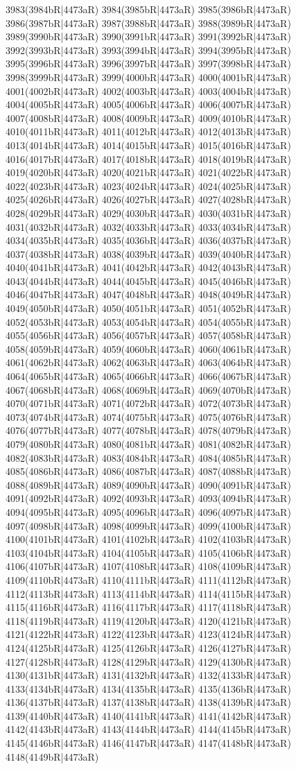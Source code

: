 3983(3984bR|4473aR) 3984(3985bR|4473aR) 3985(3986bR|4473aR) 3986(3987bR|4473aR) 3987(3988bR|4473aR) 3988(3989bR|4473aR) 3989(3990bR|4473aR) 3990(3991bR|4473aR) 3991(3992bR|4473aR) 3992(3993bR|4473aR) 3993(3994bR|4473aR) 3994(3995bR|4473aR) 3995(3996bR|4473aR) 3996(3997bR|4473aR) 3997(3998bR|4473aR) 3998(3999bR|4473aR) 3999(4000bR|4473aR) 4000(4001bR|4473aR) 4001(4002bR|4473aR) 4002(4003bR|4473aR) 4003(4004bR|4473aR) 4004(4005bR|4473aR) 4005(4006bR|4473aR) 4006(4007bR|4473aR) 4007(4008bR|4473aR) 4008(4009bR|4473aR) 4009(4010bR|4473aR) 4010(4011bR|4473aR) 4011(4012bR|4473aR) 4012(4013bR|4473aR) 4013(4014bR|4473aR) 4014(4015bR|4473aR) 4015(4016bR|4473aR) 4016(4017bR|4473aR) 4017(4018bR|4473aR) 4018(4019bR|4473aR) 4019(4020bR|4473aR) 4020(4021bR|4473aR) 4021(4022bR|4473aR) 4022(4023bR|4473aR) 4023(4024bR|4473aR) 4024(4025bR|4473aR) 4025(4026bR|4473aR) 4026(4027bR|4473aR) 4027(4028bR|4473aR) 4028(4029bR|4473aR) 4029(4030bR|4473aR) 4030(4031bR|4473aR) 4031(4032bR|4473aR) 4032(4033bR|4473aR) 4033(4034bR|4473aR) 4034(4035bR|4473aR) 4035(4036bR|4473aR) 4036(4037bR|4473aR) 4037(4038bR|4473aR) 4038(4039bR|4473aR) 4039(4040bR|4473aR) 4040(4041bR|4473aR) 4041(4042bR|4473aR) 4042(4043bR|4473aR) 4043(4044bR|4473aR) 4044(4045bR|4473aR) 4045(4046bR|4473aR) 4046(4047bR|4473aR) 4047(4048bR|4473aR) 4048(4049bR|4473aR) 4049(4050bR|4473aR) 4050(4051bR|4473aR) 4051(4052bR|4473aR) 4052(4053bR|4473aR) 4053(4054bR|4473aR) 4054(4055bR|4473aR) 4055(4056bR|4473aR) 4056(4057bR|4473aR) 4057(4058bR|4473aR) 4058(4059bR|4473aR) 4059(4060bR|4473aR) 4060(4061bR|4473aR) 4061(4062bR|4473aR) 4062(4063bR|4473aR) 4063(4064bR|4473aR) 4064(4065bR|4473aR) 4065(4066bR|4473aR) 4066(4067bR|4473aR) 4067(4068bR|4473aR) 4068(4069bR|4473aR) 4069(4070bR|4473aR) 4070(4071bR|4473aR) 4071(4072bR|4473aR) 4072(4073bR|4473aR) 4073(4074bR|4473aR) 4074(4075bR|4473aR) 4075(4076bR|4473aR) 4076(4077bR|4473aR) 4077(4078bR|4473aR) 4078(4079bR|4473aR) 4079(4080bR|4473aR) 4080(4081bR|4473aR) 4081(4082bR|4473aR) 4082(4083bR|4473aR) 4083(4084bR|4473aR) 4084(4085bR|4473aR) 4085(4086bR|4473aR) 4086(4087bR|4473aR) 4087(4088bR|4473aR) 4088(4089bR|4473aR) 4089(4090bR|4473aR) 4090(4091bR|4473aR) 4091(4092bR|4473aR) 4092(4093bR|4473aR) 4093(4094bR|4473aR) 4094(4095bR|4473aR) 4095(4096bR|4473aR) 4096(4097bR|4473aR) 4097(4098bR|4473aR) 4098(4099bR|4473aR) 4099(4100bR|4473aR) 4100(4101bR|4473aR) 4101(4102bR|4473aR) 4102(4103bR|4473aR) 4103(4104bR|4473aR) 4104(4105bR|4473aR) 4105(4106bR|4473aR) 4106(4107bR|4473aR) 4107(4108bR|4473aR) 4108(4109bR|4473aR) 4109(4110bR|4473aR) 4110(4111bR|4473aR) 4111(4112bR|4473aR) 4112(4113bR|4473aR) 4113(4114bR|4473aR) 4114(4115bR|4473aR) 4115(4116bR|4473aR) 4116(4117bR|4473aR) 4117(4118bR|4473aR) 4118(4119bR|4473aR) 4119(4120bR|4473aR) 4120(4121bR|4473aR) 4121(4122bR|4473aR) 4122(4123bR|4473aR) 4123(4124bR|4473aR) 4124(4125bR|4473aR) 4125(4126bR|4473aR) 4126(4127bR|4473aR) 4127(4128bR|4473aR) 4128(4129bR|4473aR) 4129(4130bR|4473aR) 4130(4131bR|4473aR) 4131(4132bR|4473aR) 4132(4133bR|4473aR) 4133(4134bR|4473aR) 4134(4135bR|4473aR) 4135(4136bR|4473aR) 4136(4137bR|4473aR) 4137(4138bR|4473aR) 4138(4139bR|4473aR) 4139(4140bR|4473aR) 4140(4141bR|4473aR) 4141(4142bR|4473aR) 4142(4143bR|4473aR) 4143(4144bR|4473aR) 4144(4145bR|4473aR) 4145(4146bR|4473aR) 4146(4147bR|4473aR) 4147(4148bR|4473aR) 4148(4149bR|4473aR) 